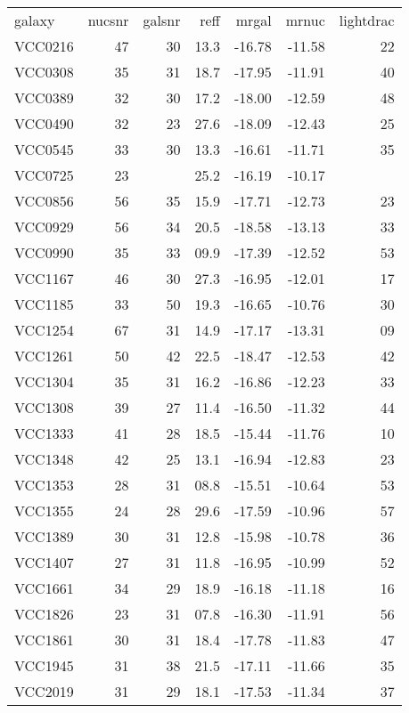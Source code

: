 \begin{tabular}{lrrrrrr}
galaxy & nucsnr & galsnr & reff &  mrgal & mrnuc & lightdrac \\
VCC0216   &  47  &  30  &  13.3  &  -16.78    &    -11.58  &  22  \\
VCC0308   &  35  &  31  &  18.7  &  -17.95    &    -11.91  &  40  \\
VCC0389   &  32  &  30  &  17.2  &  -18.00    &    -12.59  &  48  \\
VCC0490   &  32  &  23  &  27.6  &  -18.09    &    -12.43  &  25  \\
VCC0545   &  33  &  30  &  13.3  &  -16.61    &    -11.71  &  35  \\
VCC0725   &  23  &      &  25.2  &  -16.19   &   -10.17  &      \\
VCC0856   &  56  &  35  &  15.9  &  -17.71    &    -12.73  &  23  \\
VCC0929   &  56  &  34  &  20.5  &  -18.58    &    -13.13  &  33  \\
VCC0990   &  35  &  33  &  09.9  &  -17.39    &    -12.52  &  53  \\
VCC1167   &  46  &  30  &  27.3  &  -16.95    &    -12.01  &  17  \\
VCC1185   &  33  &  50  &  19.3  &  -16.65    &    -10.76  &  30  \\
VCC1254   &  67  &  31  &  14.9  &  -17.17    &    -13.31  &  09  \\
VCC1261   &  50  &  42  &  22.5  &  -18.47    &    -12.53  &  42  \\
VCC1304   &  35  &  31  &  16.2  &  -16.86    &    -12.23  &  33  \\
VCC1308   &  39  &  27  &  11.4  &  -16.50    &    -11.32  &  44  \\
VCC1333   &  41  &  28  &  18.5  &  -15.44    &    -11.76  &  10  \\
VCC1348   &  42  &  25  &  13.1  &  -16.94    &    -12.83  &  23  \\
VCC1353   &  28  &  31  &  08.8  &  -15.51    &    -10.64  &  53  \\
VCC1355   &  24  &  28  &  29.6  &  -17.59    &    -10.96  &  57  \\
VCC1389   &  30  &  31  &  12.8  &  -15.98    &    -10.78  &  36  \\
VCC1407   &  27  &  31  &  11.8  &  -16.95    &    -10.99  &  52  \\
VCC1661   &  34  &  29  &  18.9  &  -16.18    &    -11.18  &  16  \\
VCC1826   &  23  &  31  &  07.8  &  -16.30    &    -11.91  &  56  \\
VCC1861   &  30  &  31  &  18.4  &  -17.78    &    -11.83  &  47  \\
VCC1945   &  31  &  38  &  21.5  &  -17.11    &    -11.66  &  35  \\
VCC2019   &  31  &  29  &  18.1  &  -17.53    &    -11.34  &  37  \\
\end{tabular}
